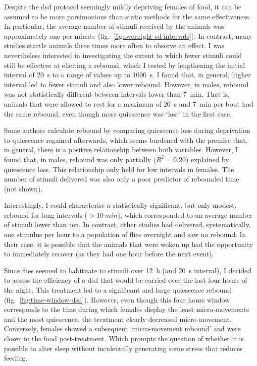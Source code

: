Despite the \gls{dsd} protocol seemingly mildly depriving females of food, it can be assumed to be more parsimonious than static methods for the same effectiveness.
In particular, the average number of stimuli received by the animals was approximately one per minute (fig.~\ref{fig:overnight-sd-intervals}).
In contrast, many studies startle animals three times more often to observe an effect\cite{shaw_correlates_2000,shaw_stress_2002,huber_sleep_2004}.
I was nevertheless interested in investigating the extent to which fewer stimuli could still be effective at eliciting a rebound, which I tested by lengthening the initial interval of 20~s to a range of values up to 1000~s.
I found that, in general, higher interval led to fewer stimuli and also lower rebound.
However, in males, rebound was not statistically different between intervals lower than 7~min.
That is, animals that were allowed to rest for a maximum of 20~s and 7~min per bout had the same rebound, even though more quiescence was `lost' in the first case.

Some authors calculate rebound by comparing quiescence loss during deprivation to quiescence regained afterwards, 
which seems burdened with the premise that, in general, there is a positive relationship between both variables\cite{shaw_stress_2002}.
However, I found that, in males, rebound was only partially ($R^2 = 0.20$) explained by quiescence loss.
This relationship only held for low intervals in females.
The number of stimuli delivered was also only a poor predictor of rebounded time (not shown).

Interestingly, I could characterise a statistically significant, but only modest, rebound  for long intervals ($> 10~min$),
which corresponded to an average number of stimuli lower than ten.
In contrast, other studies had delivered, systematically, one stimulus per hour to a population of flies overnight and saw no rebound\cite{van_alphen_dynamic_2013,faville_how_2015}. 
In their case, it is possible that the animals that were woken up had the opportunity to immediately recover (as they had one hour before the next event).

Since flies seemed to habituate to stimuli over 12~h (and 20~s interval), I decided to assess the efficiency of a \gls{dsd} 
that would  be carried over the last four hours of the night.
This treatment led to a significant and large quiescence rebound (fig.~\ref{fig:time-window-dsd}).
However, even though this four hours window corresponds to the time during which females display the least micro-movements and the most quiescence, the treatment clearly decreased micro-movement.
Conversely, females showed a subsequent `micro-movement rebound' and were closer to the food post-treatment.
Which prompts the question of whether it is possible to alter sleep without incidentally generating some stress that reduces feeding. 

